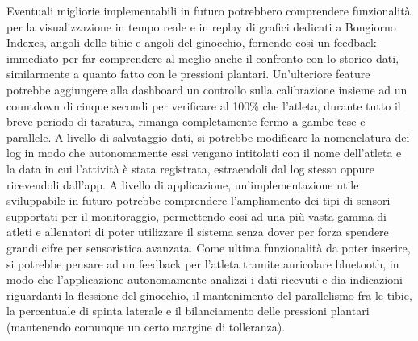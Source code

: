\documentclass[target=bach,aauheader=,style=]{thud}
\begin{document}
Eventuali migliorie implementabili in futuro potrebbero comprendere funzionalità per la visualizzazione in tempo reale e in replay di grafici dedicati a Bongiorno Indexes, angoli delle tibie e angoli del ginocchio, fornendo così un feedback immediato per far comprendere al meglio anche il confronto con lo storico dati, similarmente a quanto fatto con le pressioni plantari. Un'ulteriore feature potrebbe aggiungere alla dashboard un controllo sulla calibrazione insieme ad un countdown di cinque secondi per verificare al 100\% che l'atleta, durante tutto il breve periodo di taratura, rimanga completamente fermo a gambe tese e parallele. A livello di salvataggio dati, si potrebbe modificare la nomenclatura dei log in modo che autonomamente essi vengano intitolati con il nome dell'atleta e la data in cui l'attività è stata registrata, estraendoli dal log stesso oppure ricevendoli dall'app. A livello di applicazione, un'implementazione utile sviluppabile in futuro potrebbe comprendere l'ampliamento dei tipi di sensori supportati per il monitoraggio, permettendo così ad una più vasta gamma di atleti e allenatori di poter utilizzare il sistema senza dover per forza spendere grandi cifre per sensoristica avanzata. Come ultima funzionalità da poter inserire, si potrebbe pensare ad un feedback per l'atleta tramite auricolare bluetooth, in modo che l'applicazione autonomamente analizzi i dati ricevuti e dia indicazioni riguardanti la flessione del ginocchio, il mantenimento del parallelismo fra le tibie, la percentuale di spinta laterale e il bilanciamento delle pressioni plantari (mantenendo comunque un certo margine di tolleranza).

\backmatter



\end{document}
